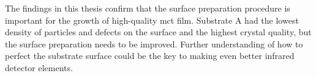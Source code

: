 The findings in this thesis confirm that the surface preparation procedure is important for the growth of high-quality \ac{mct} film. Substrate A had the lowest density of particles and defects on the surface and the highest crystal quality, but the surface preparation needs to be improved. Further understanding of how to perfect the substrate surface could be the key to making even better infrared detector elements.








